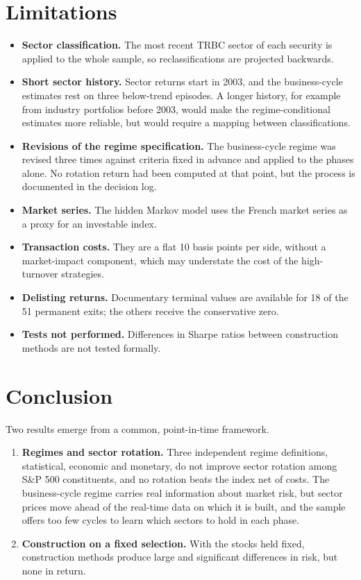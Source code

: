 \documentclass[11pt,a4paper]{article}
\begin{document}


\section{Limitations}\label{sec:lim}

\begin{itemize}
\item \textbf{Sector classification.} The most recent TRBC sector of each security is applied to the whole sample, so reclassifications are projected backwards.
\item \textbf{Short sector history.} Sector returns start in 2003, and the business-cycle estimates rest on three below-trend episodes. A longer history, for example from industry portfolios before 2003, would make the regime-conditional estimates more reliable, but would require a mapping between classifications.
\item \textbf{Revisions of the regime specification.} The business-cycle regime was revised three times against criteria fixed in advance and applied to the phases alone. No rotation return had been computed at that point, but the process is documented in the decision log.
\item \textbf{Market series.} The hidden Markov model uses the French market series as a proxy for an investable index.
\item \textbf{Transaction costs.} They are a flat 10 basis points per side, without a market-impact component, which may understate the cost of the high-turnover strategies.
\item \textbf{Delisting returns.} Documentary terminal values are available for 18 of the 51 permanent exits; the others receive the conservative zero.
\item \textbf{Tests not performed.} Differences in Sharpe ratios between construction methods are not tested formally.
\end{itemize}

\section{Conclusion}\label{sec:concl}

Two results emerge from a common, point-in-time framework.

\begin{enumerate}
\item \textbf{Regimes and sector rotation.} Three independent regime definitions, statistical, economic and monetary, do not improve sector rotation among S\&P 500 constituents, and no rotation beats the index net of costs. The business-cycle regime carries real information about market risk, but sector prices move ahead of the real-time data on which it is built, and the sample offers too few cycles to learn which sectors to hold in each phase.
\item \textbf{Construction on a fixed selection.} With the stocks held fixed, construction methods produce large and significant differences in risk, but none in return.
\end{enumerate}
\end{document}
